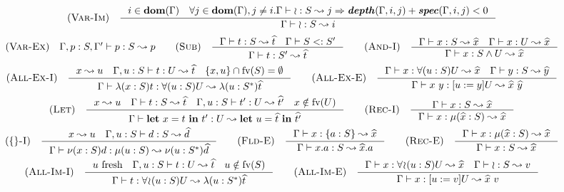 \begin{minipage}{\textwidth} \[\begin{array}{c}
    \RULE{Var-Im} \quad \inference{
        i \in \DOM{\Gamma} \quad
        \forall j \in \DOM{\Gamma}, j \neq i.
            \TJ{\Gamma}{\IMP}{S}{j} \Rightarrow
            \DEPTH{\Gamma, i, j} + \SPEC{\Gamma, i, j} < 0
    }{
        \TJ{\Gamma}{\IMP}{S}{i}
    } \\[4mm]

    \RULE{Var-Ex} \quad \TJ{\Gamma, p: S, \Gamma'}{p}{S}{p} \qquad

    \RULE{Sub} \quad \inference{
        \TJ{\Gamma}{t}{S}{\HAT{t}} \quad
        \SJ{\Gamma}{S}{S'}
    }{
        \TJ{\Gamma}{t}{S'}{\HAT{t}}
    } \qquad

    \RULE{And-I} \quad \inference{
        \TJ{\Gamma}{x}{S}{\HAT{x}} \quad
        \TJ{\Gamma}{x}{U}{\HAT{x}}
    }{
        \TJ{\Gamma}{x}{\AGG{S}{U}}{\HAT{x}}
    } \\[4mm]

    \RULE{All-Ex-I} \quad \inference{
        x \leadsto u \quad
        \TJ{\Gamma, u: S}{t}{U}{\HAT{t}} \quad
        \{x, u\} \cap \FV{S} = \emptyset
    }{
        \TJ{\Gamma}{\ABS{x}{S}{t}}{\DFUN{u}{S}{U}}{\ABS{u}{\TRANS{S}}{\HAT{t}}}
    } \qquad

    \RULE{All-Ex-E} \quad \inference{
        \TJ{\Gamma}{x}{\DFUN{u}{S}{U}}{\HAT{x}} \quad
        \TJ{\Gamma}{y}{S}{\HAT{y}}
    }{
        \TJ{\Gamma}{x\ y}{\SUB{u}{y}U}{\HAT{x}\ \HAT{y}}
    } \\[4mm]

    \RULE{Let} \quad \inference{
        x \leadsto u \quad
        \TJ{\Gamma}{t}{S}{\HAT{t}} \quad
        \TJ{\Gamma, u: S}{t'}{U}{\HAT{t'}} \quad
        x \notin \FV{U}
    }{
        \TJ{\Gamma}{\LET{x}{t}{t'}}{U}{\LET{u}{\HAT{t}}{\HAT{t'}}}
    } \qquad

    \RULE{Rec-I} \quad \inference{
        \TJ{\Gamma}{x}{S}{\HAT{x}}
    }{
        \TJ{\Gamma}{x}{\REC{\HAT{x}}{S}}{\HAT{x}}
    } \\[4mm]

    \RULE{\{\}-I} \quad \inference{
        x \leadsto u \quad
        \TJ{\Gamma, u: S}{d}{S}{\HAT{d}}
    }{
        \TJ{\Gamma}{\OBJ{x}{S}{d}}{\REC{u}{S}}{\OBJ{u}{\TRANS{S}}{\HAT{d}}}
    } \qquad

    \RULE{Fld-E} \quad \inference{
        \TJ{\Gamma}{x}{\FDEC{a}{S}}{\HAT{x}}
    }{
        \TJ{\Gamma}{x.a}{S}{\HAT{x}.a}
    } \qquad

    \RULE{Rec-E} \quad \inference{
        \TJ{\Gamma}{x}{\REC{\HAT{x}}{S}}{\HAT{x}}
    }{
        \TJ{\Gamma}{x}{S}{\HAT{x}}
    } \\[4mm]

    \RULE{All-Im-I} \quad \inference{
        u\ \text{fresh} \quad
        \TJ{\Gamma, u: S}{t}{U}{\HAT{t}} \quad
        u \notin \FV{S}
    }{
        \TJ{\Gamma}{t}{\IFUN{u}{S}{U}}{\ABS{u}{\TRANS{S}}{\HAT{t}}}
    } \qquad

    \RULE{All-Im-E} \quad \inference{
        \TJ{\Gamma}{x}{\IFUN{u}{S}{U}}{\HAT{x}} \quad
        \TJ{\Gamma}{\IMP}{S}{v}
    }{
        \TJ{\Gamma}{x}{\SUB{u}{v}U}{\HAT{x}\ v}
    }
\end{array}\] \end{minipage}
